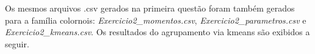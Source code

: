 \clearpage
Os mesmos arquivos .csv gerados na primeira questão foram também gerados para a família colornois: \textit{Exercicio2\_momentos.csv},  \textit{Exercicio2\_parametros.csv} e \textit{Exercicio2\_kmeans.csv}. Os resultados do agrupamento via kmeans são exibidos a seguir.

\begin{figure}[ht!]
	\vspace{0mm}	%
	\begin{center}
	\end{center}
	\vspace{-3mm}	%
	\label{ex2_fig2}
\end{figure}

